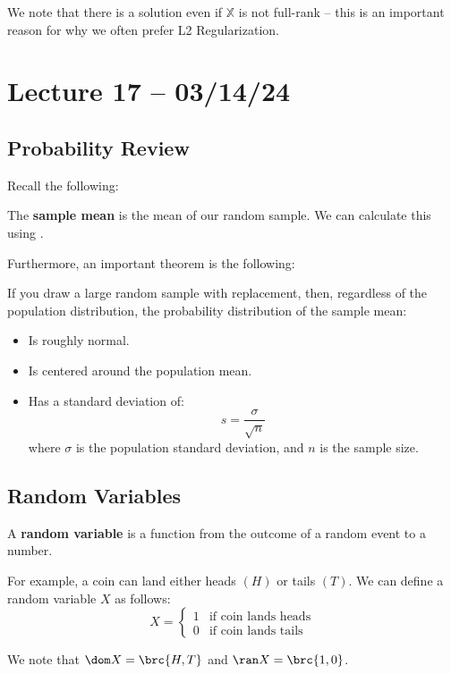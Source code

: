 \documentclass[openany]{book}
\begin{document}
\begin{warn}
	We note that there is a solution even if $\mathbb X$ is not full-rank -- this is an important reason for why we often prefer L2 Regularization.
\end{warn}

\section{Lecture 17 -- 03/14/24}
\subsection{Probability Review}
Recall the following:
\begin{defn}
	The \textbf{sample mean} is the mean of our random sample. We can calculate this using .
\end{defn}

Furthermore, an important theorem is the following:
\begin{thm}
	If you draw a large random sample with replacement, then, regardless of the population distribution, the probability distribution of the sample mean:
	\begin{itemize}
		\item Is roughly normal.
		\item Is centered around the population mean.
		\item Has a standard deviation of:
		\begin{equation*}
			s = \dfrac{\sigma}{\sqrt{n}}
		\end{equation*}
		where $\sigma$ is the population standard deviation, and $n$ is the sample size.
	\end{itemize}
\end{thm}

\subsection{Random Variables}
\begin{defn}
	A \textbf{random variable} is a function from the outcome of a random event to a number.
\end{defn}
\begin{example}
	For example, a coin can land either heads $(H)$ or tails $(T)$. We can define a random variable $X$ as follows:
	\begin{equation*}
		X = \begin{cases}
				1 & \text{if coin lands heads} \\
				0 & \text{if coin lands tails}
			\end{cases}
	\end{equation*}

	We note that $\dom X = \brc{H, T}$ and $\ran X = \brc{1,0}$.
\end{example}
\end{document}
